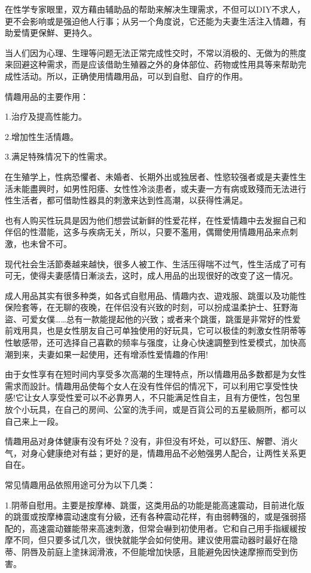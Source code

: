 \documentclass[12pt,UTF8]{ctexbook}
\begin{document}
在性学专家眼里，双方藉由辅助品的帮助来解决生理需求，不但可以DIY不求人，更不会影响或是强迫他人行事；从另一个角度说，它还能为夫妻生活注入情趣，有助爱情更保鮮、更持久。

当人们因为心理、生理等问题无法正常完成性交时，不常以消极的、无做为的熊度来回避这种需求，而是应该借助生殖器之外的身体部位、药物或性用具等来帮助完成性活动。所以，正确使用情趣用品，可以到自慰、自疗的作用。

情趣用品的主要作用：

1.治疗及提高性能力。

2.增加性生活情趣。

3.满足特殊情况下的性需求。

在生殖学上，性病恐懼者、未婚者、长期外出或独居者、性慾较强者或是夫妻性生活未能盡興时，如男性阳痿、女性性冷淡患者，或夫妻一方有病或致殘而无法进行性生活者，都可借助性器具的刺激来达到性高潮，以获得性满足。

也有人购买性玩具是因为他们想尝试新鲜的性爱花样，在性爱情趣中去发掘自己和伴侣的性潜能，这多与疾病无关，所以，只要不濫用，偶爾使用情趣用品来点刺激，也未曾不可。

现代社会生活節奏越来越快，很多人被工作、生活压得喘不过气，性生活成了可有可无，使得夫妻感情日漸淡去，这时，成人用品的出现很好的改变了这一情况。

成人用品其实有很多种类，如各式自慰用品、情趣内衣、遊戏服、跳蛋以及功能性保险套等，在无聊的夜晚，在伴侣没有兴致的时刻，可以扮成温柔护士、狂野海盜、可爱女僕……总有一款能提起他的兴致；或者来个跳蛋，跳蛋是非常好的性爱前戏用具，也是女性朋友自己可单独使用的好玩具，它可以极佳的刺激女性阴蒂等性敏感带，还可选择自己喜歡的频率与强度，让身心快速調整到性爱模式，加快高潮到来，夫妻如果一起使用，还有增添性爱情趣的作用!

由于女性享有在短时间内享受多次高潮的生理特点，所以情趣用品多数都是为女性需求而設計。情趣用品使每个女人在没有性伴侣的情况下，可以利用它享受性快感!它让女人享受性爱可以不必靠男人，不只能满足性自主，且有方便性，包包里放个小玩具，在自己的房间、公室的洗手间，或是百貨公司的五星級厕所，都可以自己来上一段。

情趣用品对身体健康有没有坏处？没有，非但没有坏处，可以舒压、解鬱、消火气，对身心健康绝对有益；更好的是，情趣用品不必勉强男人配合，让两性关系更自在。

常见情趣用品依照用途可分为以下几类：

1.阴蒂自慰用。主要是按摩棒、跳蛋，这类用品的功能是能高速震动，目前进化版的跳蛋或按摩棒震动速度有分級，还有各种震动花样，有由弱轉强的，或是强弱搭配的，高速震动雖能带来高速刺激，但常会嚇到初使用者。它和自己用手指緩緩按摩不同，但只要多试几次，很快就能学会如何使用。建议使用震动器时最好在隐蒂、阴唇及前庭上塗抹润滑液，不但能增加快感，且能避免因快速摩擦而受到伤害。
\end{document}
